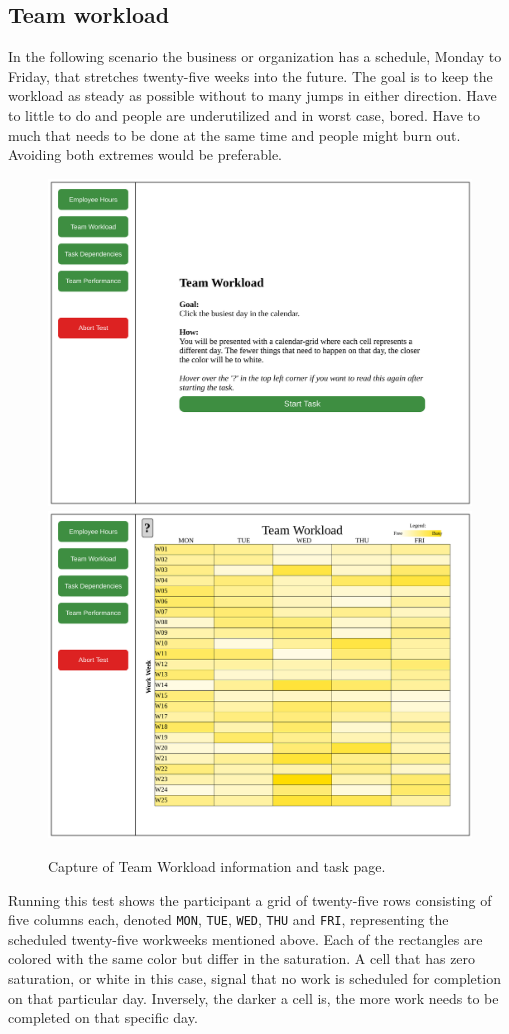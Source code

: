 {%
  \newpage
  \subsection{Team workload}

    \textit{\ideaTwo}

    In the following scenario the business or organization has a schedule,
    Monday to Friday, that stretches twenty-five weeks into the future. The
    goal is to keep the workload as steady as possible without to many
    jumps in either direction. Have to little to do and people are
    underutilized and in worst case, bored. Have to much that needs to be
    done at the same time and people might burn out. Avoiding both
    extremes would be preferable.

    \begin{figure}[h!]
      \centering
      \includegraphics[width=.49\textwidth]{figures/captures/webapp_team_workload_info.pdf}
      \includegraphics[width=.49\textwidth]{figures/captures/webapp_team_workload_task.pdf}
      \caption{Capture of Team Workload information and task page.}
    \end{figure}

    Running this test shows the participant a grid of twenty-five rows
    consisting of five columns each, denoted
    \texttt{MON},
    \texttt{TUE},
    \texttt{WED},
    \texttt{THU} and
    \texttt{FRI},
    representing the scheduled twenty-five workweeks mentioned above. Each
    of the rectangles are colored with the same color but differ in the
    saturation. A cell that has zero saturation, or white in this case,
    signal that no work is scheduled for completion on that particular day.
    Inversely, the darker a cell is, the more work needs to be completed on
    that specific day.

}
